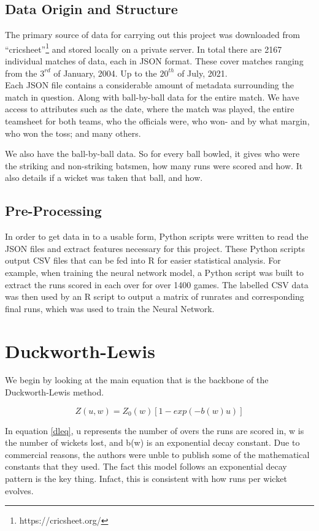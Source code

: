 \documentclass[11pt]{amsart}
\begin{document}
\subsection{Data Origin and Structure}
The primary source of data for carrying out this project was downloaded from ``cricsheet''\footnote{https://cricsheet.org/}
and stored locally on a private server. In total there are 2167 individual matches of data, each in JSON format.
These cover matches ranging from the $3^{rd}$ of January, 2004. Up to the $20^{th}$ of July, 2021. \\ 

Each JSON file contains a considerable amount of metadata surrounding the match in question. Along with 
ball-by-ball data for the entire match. We have access to attributes such as the date, where the match was played,
the entire teamsheet for both teams, who the officials were, who won- and by what margin, who won the toss; and many others.

We also have the ball-by-ball data. So for every ball bowled, it gives who were the striking and non-striking batsmen, how many runs
were scored and how. It also details if a wicket was taken that ball, and how.

\subsection{Pre-Processing}
In order to get data in to a usable form, Python scripts were written to read the JSON files and extract features necessary for this project.
These Python scripts output CSV files that can be fed into R for easier statistical analysis. For example, when training the neural network model,
a Python script was built to extract the runs scored in each over for over 1400 games. The labelled CSV data was then used by an R script to 
output a matrix of runrates and corresponding final runs, which was used to train the Neural Network.


\section{Duckworth-Lewis}
We begin by looking at the main equation that is the backbone of the Duckworth-Lewis method.

\begin{equation}
    \label{dleq}
    Z(u,w) = Z_0(w)[1-exp(-b(w)u)]
\end{equation}

In equation \ref{dleq}, u represents the number of overs the runs are scored in, w is the number of wickets lost, and b(w) is an exponential decay constant.
Due to commercial reasons, the authors were unble to publish some of the mathematical constants that they used. The fact this model follows an exponential decay 
pattern is the key thing. Infact, this is consistent with how runs per wicket evolves. \\
\end{document}
